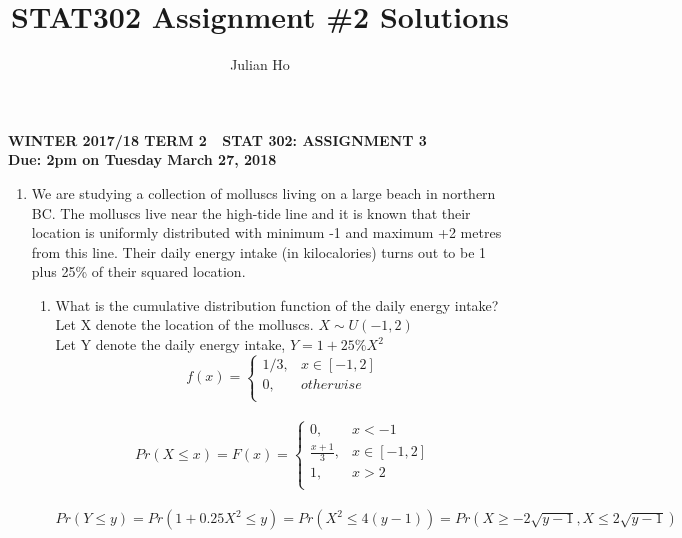 \documentclass[11pt]{article}
\title{STAT302 Assignment \#2 Solutions}
\author{Julian Ho}
\begin{document}
\begin{center}
\textbf{WINTER 2017/18 TERM 2  \,\, STAT 302: ASSIGNMENT 3 \\
Due: 2pm on Tuesday March 27, 2018}
\end{center}

\begin{enumerate}[label=\textbf{Question \arabic*:},start=1]

\item
We are studying a collection of molluscs living on a large beach in northern BC. The molluscs live near the high-tide line and it is known that their location is uniformly distributed with minimum -1 and maximum +2 metres from this line. Their daily energy intake (in kilocalories) turns out to be 1 plus 25\% of their squared location.
\begin{enumerate}
	\item What is the cumulative distribution function of the daily energy intake?\\
	
	Let X denote the location of the molluscs. $X \sim U(-1, 2)$ \\
	Let Y denote the daily energy intake, $Y = 1 + 25\% X^2$\\
	$$f(x) = \begin{cases}
		1/3, & x \in [-1, 2]\\
		0, & otherwise\\
		\end{cases}$$\\
	$$Pr(X \leq x) = F(x) = \begin{cases}
		0, & x < -1 \\
		\frac{x + 1}{3}, & x \in [-1, 2]\\
		1, & x > 2\\
		\end{cases}$$\\

	$Pr(Y \leq y) = Pr(1 + 0.25 X^2 \leq y) = Pr(X^2 \leq 4(y-1)) = Pr(X \geq -2\sqrt{y-1}, X \leq 2\sqrt{y-1})$ \\
	

\end{enumerate}
\end{enumerate}
\end{document}
